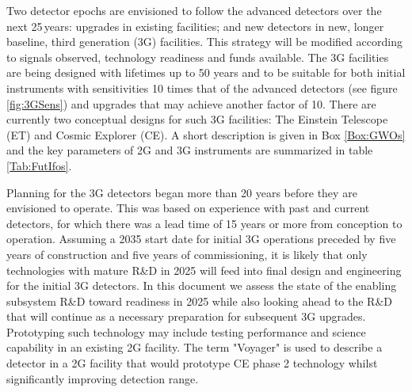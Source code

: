 Two detector epochs are envisioned 
to follow the advanced detectors over the next 25\,years: upgrades in existing facilities; %
and new detectors in new, longer baseline, third generation (3G) facilities. This strategy will be modified according to signals observed, technology readiness and funds available.
The 3G facilities are being designed with lifetimes up to 50 years and to be suitable for both initial instruments with sensitivities 10 times that of the advanced detectors (see figure \ref{fig:3GSens}) and upgrades that may achieve another factor of 10. There are currently two conceptual designs for such 3G facilities:  The Einstein Telescope (ET) and Cosmic Explorer (CE). A short description is given in Box \ref{Box:GWOs} and the key parameters of 2G and 3G instruments are summarized in table \ref{Tab:FutIfos}.

Planning for the 3G detectors began more than 20 years before they are envisioned to operate. This was based on experience with past and current detectors, for which there was a lead time of 15 years or more from conception to operation. Assuming a 2035 start date for initial 3G operations preceded by five years of construction and five years of commissioning, it is likely that only technologies with mature R\&D in 2025 will feed into final design and engineering for the initial 3G detectors. In this document we assess the state of the enabling subsystem R\&D toward readiness in 2025 while also looking ahead to the R\&D that will continue as a necessary preparation for subsequent 3G upgrades. Prototyping such technology may include testing performance and science capability in an existing 2G facility. The term "Voyager" is used to describe a detector in a 2G facility that would prototype CE phase 2 technology whilst significantly improving detection range. 


